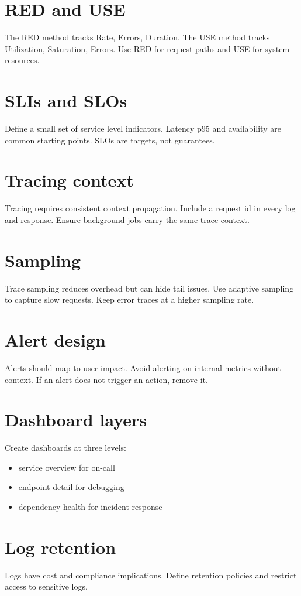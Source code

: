 \section{RED and USE}
The RED method tracks Rate, Errors, Duration.
The USE method tracks Utilization, Saturation, Errors.
Use RED for request paths and USE for system resources.

\section{SLIs and SLOs}
Define a small set of service level indicators.
Latency p95 and availability are common starting points.
SLOs are targets, not guarantees.

\section{Tracing context}
Tracing requires consistent context propagation.
Include a request id in every log and response.
Ensure background jobs carry the same trace context.

\section{Sampling}
Trace sampling reduces overhead but can hide tail issues.
Use adaptive sampling to capture slow requests.
Keep error traces at a higher sampling rate.

\section{Alert design}
Alerts should map to user impact.
Avoid alerting on internal metrics without context.
If an alert does not trigger an action, remove it.

\section{Dashboard layers}
Create dashboards at three levels:
\begin{itemize}[nosep]
  \item service overview for on-call
  \item endpoint detail for debugging
  \item dependency health for incident response
\end{itemize}

\section{Log retention}
Logs have cost and compliance implications.
Define retention policies and restrict access to sensitive logs.

